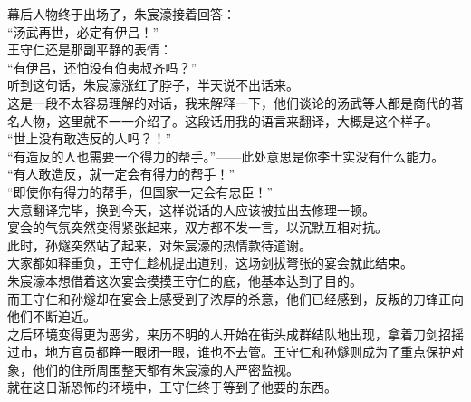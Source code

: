 \begin{multicols}{\theparacolNo}
幕后人物终于出场了，朱宸濠接着回答：\\

“汤武再世，必定有伊吕！”\\

王守仁还是那副平静的表情：\\

“有伊吕，还怕没有伯夷叔齐吗？”\\

听到这句话，朱宸濠涨红了脖子，半天说不出话来。\\

这是一段不太容易理解的对话，我来解释一下，他们谈论的汤武等人都是商代的著名人物，这里就不一一介绍了。这段话用我的语言来翻译，大概是这个样子。\\

“世上没有敢造反的人吗？！”\\

“有造反的人也需要一个得力的帮手。”——此处意思是你李士实没有什么能力。\\

“有人敢造反，就一定会有得力的帮手！”\\

“即使你有得力的帮手，但国家一定会有忠臣！”\\

大意翻译完毕，换到今天，这样说话的人应该被拉出去修理一顿。\\

宴会的气氛突然变得紧张起来，双方都不发一言，以沉默互相对抗。\\

此时，孙燧突然站了起来，对朱宸濠的热情款待道谢。\\

大家都如释重负，王守仁趁机提出道别，这场剑拔弩张的宴会就此结束。\\

朱宸濠本想借着这次宴会摸摸王守仁的底，他基本达到了目的。\\

而王守仁和孙燧却在宴会上感受到了浓厚的杀意，他们已经感到，反叛的刀锋正向他们不断迫近。\\

之后环境变得更为恶劣，来历不明的人开始在街头成群结队地出现，拿着刀剑招摇过市，地方官员都睁一眼闭一眼，谁也不去管。王守仁和孙燧则成为了重点保护对象，他们的住所周围整天都有朱宸濠的人严密监视。\\

就在这日渐恐怖的环境中，王守仁终于等到了他要的东西。\\


\end{multicols}
